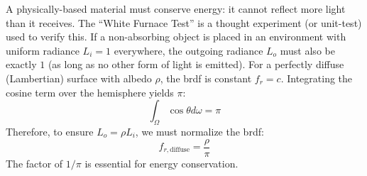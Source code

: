 A physically-based material must conserve energy: it cannot reflect more light than it receives.
The ``White Furnace Test'' is a thought experiment (or unit-test) used to verify this.
If a non-absorbing object is placed in an environment with uniform radiance $L_i = 1$ everywhere,
the outgoing radiance $L_o$ must also be exactly $1$ (as long as no other form of light is emitted).
For a perfectly diffuse (Lambertian) surface with albedo $\rho$, the \gls{brdf} is constant $f_r = c$.
Integrating the cosine term over the hemisphere yields $\pi$:
\[
    \int_{\Omega} \cos\theta d\omega = \pi
\]
Therefore, to ensure $L_o = \rho L_i$, we must normalize the \gls{brdf}:
\[
f_{r, \text{diffuse}} = \frac{\rho}{\pi}
\]
The factor of $1/\pi$ is essential for energy conservation.